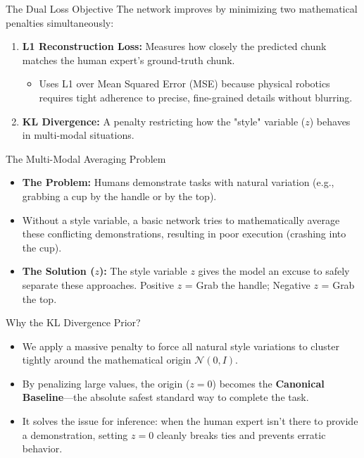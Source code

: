 \documentclass[11pt, aspectratio=169]{beamer}
\begin{document}
\begin{frame}{The Dual Loss Objective}
    The network improves by minimizing two mathematical penalties simultaneously:
    \vspace{1em}
    \begin{enumerate}
        \item \textbf{L1 Reconstruction Loss:} Measures how closely the predicted chunk matches the human expert's ground-truth chunk.
        \begin{itemize}
            \item Uses L1 over Mean Squared Error (MSE) because physical robotics requires tight adherence to precise, fine-grained details without blurring.
        \end{itemize}
        \item \textbf{KL Divergence:} A penalty restricting how the "style" variable ($z$) behaves in multi-modal situations.
    \end{enumerate}
\end{frame}

\begin{frame}{The Multi-Modal Averaging Problem}
    \begin{itemize}
        \item \textbf{The Problem:} Humans demonstrate tasks with natural variation (e.g., grabbing a cup by the handle or by the top).
        \item Without a style variable, a basic network tries to mathematically average these conflicting demonstrations, resulting in poor execution (crashing into the cup).
        \item \textbf{The Solution ($z$):} The style variable $z$ gives the model an excuse to safely separate these approaches. Positive $z$ = Grab the handle; Negative $z$ = Grab the top.
    \end{itemize}
\end{frame}

\begin{frame}{Why the KL Divergence Prior?}
    \begin{itemize}
        \item We apply a massive penalty to force all natural style variations to cluster tightly around the mathematical origin $\mathcal{N}(0,I)$.
        \item By penalizing large values, the origin ($z=0$) becomes the \textbf{Canonical Baseline}---the absolute safest standard way to complete the task.
        \item It solves the issue for inference: when the human expert isn't there to provide a demonstration, setting $z=0$ cleanly breaks ties and prevents erratic behavior.
    \end{itemize}
\end{frame}
\end{document}
